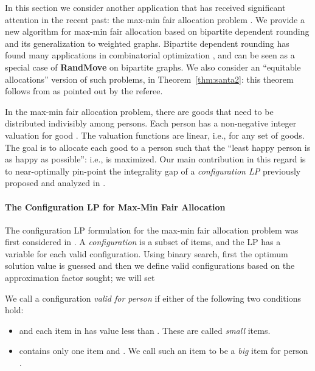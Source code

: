 In this section we consider another application that has received significant attention in the recent past: the max-min fair allocation problem
\cite{dani:05,julia:focs09,asadpour:stoc07,asadpour-feige-saberi,bansal:stoc06}. We provide a new algorithm for max-min fair allocation based on bipartite dependent rounding \cite{gkps:dep-round} and its generalization to weighted graphs. Bipartite dependent rounding has found many applications in combinatorial optimization \cite{srin:level-sets,gkps:dep-round,kmps:unified-sched}, and can be seen as a special case of {\bf RandMove} on bipartite graphs. We also consider an ``equitable allocations'' version of
such problems, in Theorem~\ref{thm:santa2}: this theorem follows from \cite{shmoys-tardos:gap} as pointed out by the referee. 

In the max-min fair allocation problem,
there are  goods that need to be distributed indivisibly among  persons. Each person  has a non-negative integer valuation  for good . The valuation functions are linear, i.e.,  for any set of  goods. The goal is to allocate each good to a person such that the ``least happy person is as happy as possible'': i.e.,  is maximized. Our main contribution  in this regard
is to near-optimally pin-point the integrality gap of a {\em configuration LP} previously proposed and analyzed in \cite{bansal:stoc06,asadpour:stoc07}.


\noindent
\paragraph{\textbf{The Configuration LP for Max-Min Fair Allocation}}

The configuration LP formulation for the max-min fair allocation problem was first considered in
\cite{bansal:stoc06}. A {\it configuration} is a subset of items,
and the LP has a
variable for each valid configuration. Using binary search, first the optimum solution value  is guessed and then
we define valid configurations based on the approximation factor  sought; we will set

We call a configuration   {\it valid for person } if either of the following two conditions hold:
\begin{itemize}
\item   and each item  in  has value less than . These are called {\em small} items.
\item  contains only one item  and . We call such an item  to be a {\em big} item for person .
\end{itemize}


